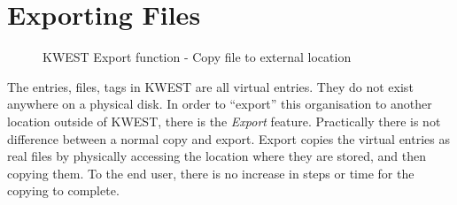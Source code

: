 \section{Exporting Files}
\begin{figure}[htb]
\centering
\setlength\fboxsep{0pt}
\setlength\fboxrule{0.5pt}
\caption{KWEST Export function - Copy file to external location}
\label{fig:dfd0}
\end{figure}
The entries, files, tags in KWEST are all virtual entries. They do not exist anywhere on a physical disk. In order to ``export'' this organisation to another location outside of KWEST, there is the \emph{Export} feature. Practically there is not difference between a normal copy and export. Export copies the virtual entries as real files by physically accessing the location where they are stored, and then copying them. To the end user, there is no increase in steps or time for the copying to complete.